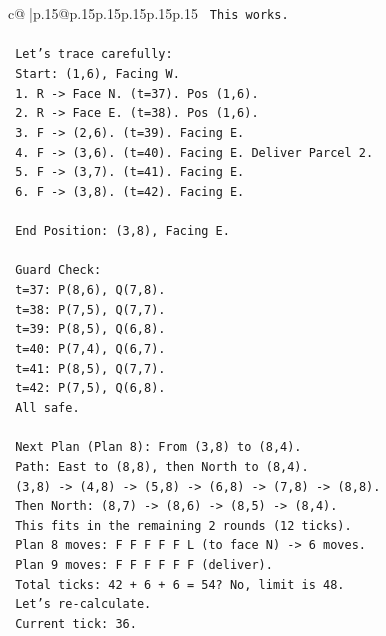 \documentclass{article}
\begin{document}
{\begin{supertabular}{c@{$\;$}|p{.15\linewidth}@{}p{.15\linewidth}p{.15\linewidth}p{.15\linewidth}p{.15\linewidth}p{.15\linewidth}}
{{{\texttt{   This works.} \\
\\ 
\texttt{   Let's trace carefully:} \\
\texttt{   Start: (1,6), Facing W.} \\
\texttt{   1. R {-}> Face N. (t=37). Pos (1,6).} \\
\texttt{   2. R {-}> Face E. (t=38). Pos (1,6).} \\
\texttt{   3. F {-}> (2,6). (t=39). Facing E.} \\
\texttt{   4. F {-}> (3,6). (t=40). Facing E. Deliver Parcel 2.} \\
\texttt{   5. F {-}> (3,7). (t=41). Facing E.} \\
\texttt{   6. F {-}> (3,8). (t=42). Facing E.} \\
\\ 
\texttt{   End Position: (3,8), Facing E.} \\
\\ 
\texttt{   Guard Check:} \\
\texttt{   t=37: P(8,6), Q(7,8).} \\
\texttt{   t=38: P(7,5), Q(7,7).} \\
\texttt{   t=39: P(8,5), Q(6,8).} \\
\texttt{   t=40: P(7,4), Q(6,7).} \\
\texttt{   t=41: P(8,5), Q(7,7).} \\
\texttt{   t=42: P(7,5), Q(6,8).} \\
\texttt{   All safe.} \\
\\ 
\texttt{   Next Plan (Plan 8): From (3,8) to (8,4).} \\
\texttt{   Path: East to (8,8), then North to (8,4).} \\
\texttt{   (3,8) {-}> (4,8) {-}> (5,8) {-}> (6,8) {-}> (7,8) {-}> (8,8).} \\
\texttt{   Then North: (8,7) {-}> (8,6) {-}> (8,5) {-}> (8,4).} \\
\texttt{   This fits in the remaining 2 rounds (12 ticks).} \\
\texttt{   Plan 8 moves: F F F F F L (to face N) {-}> 6 moves.} \\
\texttt{   Plan 9 moves: F F F F F F (deliver).} \\
\texttt{   Total ticks: 42 + 6 + 6 = 54? No, limit is 48.} \\
\texttt{   Let's re{-}calculate.} \\
\texttt{   Current tick: 36.} \\
}}}
\end{supertabular}}
\end{document}
